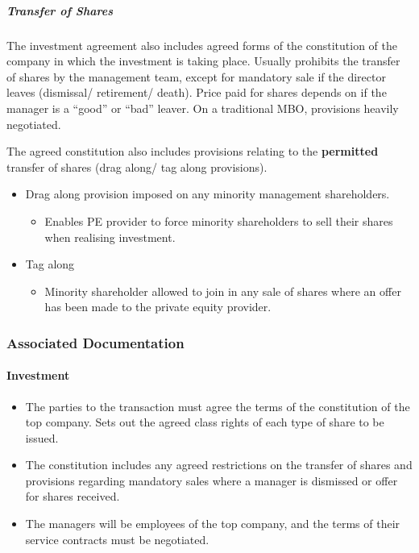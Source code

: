 \documentclass[
]{article}
\providecommand{\tightlist}{%
  \setlength{\itemsep}{0pt}\setlength{\parskip}{0pt}}
\begin{document}
\hypertarget{transfer-of-shares-1}{%
\subparagraph{Transfer of Shares}\label{transfer-of-shares-1}}

The investment agreement also includes agreed forms of the constitution
of the company in which the investment is taking place. Usually
prohibits the transfer of shares by the management team, except for
mandatory sale if the director leaves (dismissal/ retirement/ death).
Price paid for shares depends on if the manager is a ``good'' or ``bad''
leaver. On a traditional MBO, provisions heavily negotiated.

The agreed constitution also includes provisions relating to the
\textbf{permitted} transfer of shares (drag along/ tag along
provisions).

\begin{itemize}
\tightlist
\item
  Drag along provision imposed on any minority management shareholders.

  \begin{itemize}
  \tightlist
  \item
    Enables PE provider to force minority shareholders to sell their
    shares when realising investment.
  \end{itemize}
\item
  Tag along

  \begin{itemize}
  \tightlist
  \item
    Minority shareholder allowed to join in any sale of shares where an
    offer has been made to the private equity provider.
  \end{itemize}
\end{itemize}

\hypertarget{associated-documentation}{%
\subsubsection{Associated
Documentation}\label{associated-documentation}}

\hypertarget{investment-1}{%
\paragraph{Investment}\label{investment-1}}

\begin{itemize}
\tightlist
\item
  The parties to the transaction must agree the terms of the
  constitution of the top company. Sets out the agreed class rights of
  each type of share to be issued.
\item
  The constitution includes any agreed restrictions on the transfer of
  shares and provisions regarding mandatory sales where a manager is
  dismissed or offer for shares received.
\item
  The managers will be employees of the top company, and the terms of
  their service contracts must be negotiated.
\end{itemize}
\end{document}
